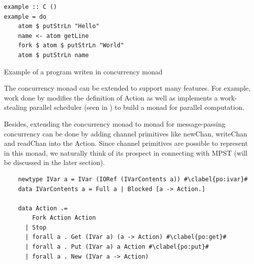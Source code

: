 \begin{code}
\begin{verbatim}
example :: C ()
example = do 
    atom $ putStrLn "Hello" 
    name <- atom getLine 
    fork $ atom $ putStrLn "World"
    atom $ putStrLn name
\end{verbatim}
\caption{Example of a program writen in concurrency monad}
\end{code}

The concurrency monad can be extended to support many features. For example, work done by \cite{marlowMonadDeterministicParallelism} modifies the definition of Action as well as implements a work-stealing parallel scheduler (seen in ) to build a monad for parallel computation. 

Besides, extending the concurrency monad to monad for message-passing concurrency can be done by adding channel primitives like newChan, writeChan and readChan into the Action. Since channel primitives are possible to represent in this monad, we naturally think of its prospect in connecting with MPST (will be discussed in the later section).
\begin{code}
  \begin{verbatim}
    newtype IVar a = IVar (IORef (IVarContents a)) #\clabel{po:ivar}#
    data IVarContents a = Full a | Blocked [a -> Action.]
    
    data Action .=
        Fork Action Action
      | Stop
      | forall a . Get (IVar a) (a -> Action) #\clabel{po:get}#
      | forall a . Put (IVar a) a Action #\clabel{po:put}#
      | forall a . New (IVar a -> Action)
  \end{verbatim}
  \label{b:mo:c3}
\end{code}

